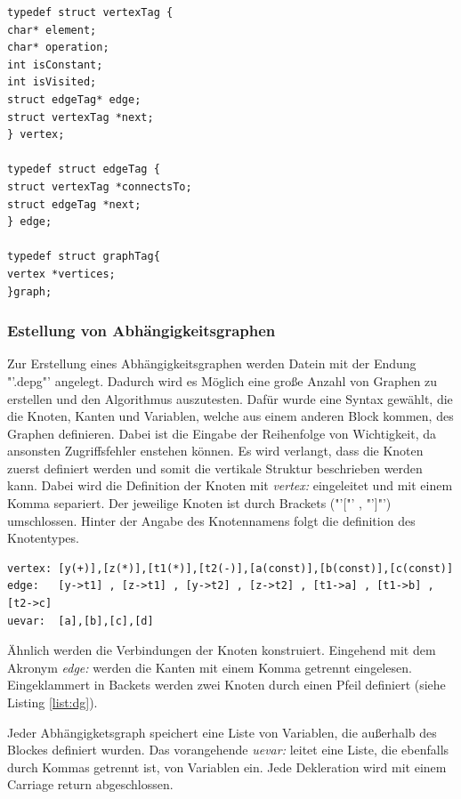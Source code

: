 \begin{lstlisting}[caption=Struktur eines Graphen., label=list:graph]
typedef struct vertexTag {
char* element;    
char* operation;  
int isConstant;
int isVisited;
struct edgeTag* edge;
struct vertexTag *next;
} vertex;

typedef struct edgeTag {
struct vertexTag *connectsTo;
struct edgeTag *next;
} edge;

typedef struct graphTag{
vertex *vertices;
}graph;
\end{lstlisting}

\subsubsection*{Estellung von Abhängigkeitsgraphen}
Zur Erstellung eines Abhängigkeitsgraphen werden Datein mit der Endung "'.depg"' angelegt. Dadurch wird es Möglich eine große Anzahl von Graphen zu erstellen und den Algorithmus auszutesten. Dafür wurde eine Syntax gewählt, die die Knoten, Kanten und Variablen, welche aus einem anderen Block kommen, des Graphen definieren. Dabei ist die Eingabe der Reihenfolge von Wichtigkeit, da ansonsten Zugriffsfehler enstehen können. Es wird verlangt, dass die Knoten zuerst definiert werden und somit die vertikale Struktur beschrieben werden kann. Dabei wird die Definition der Knoten mit \textit{vertex:} eingeleitet und mit einem Komma separiert. Der jeweilige Knoten ist durch Brackets ("'["' , "']"') umschlossen. Hinter der Angabe des Knotennamens folgt die definition des Knotentypes. 
\begin{lstlisting}[caption=Konstruktion eines Abhängigkeitsgraphen., label=list:dg]
vertex: [y(+)],[z(*)],[t1(*)],[t2(-)],[a(const)],[b(const)],[c(const)]
edge:   [y->t1] , [z->t1] , [y->t2] , [z->t2] , [t1->a] , [t1->b] ,[t2->c] 
uevar:  [a],[b],[c],[d]
\end{lstlisting}
Ähnlich werden die Verbindungen der Knoten konstruiert. Eingehend mit dem Akronym \textit{edge:} werden die Kanten mit einem Komma getrennt eingelesen. Eingeklammert in Backets werden zwei Knoten durch einen Pfeil definiert (siehe Listing \ref{list:dg}). 

Jeder Abhängigketsgraph speichert eine Liste von Variablen, die außerhalb des Blockes definiert wurden. Das 
vorangehende \textit{uevar:} leitet eine Liste, die ebenfalls durch Kommas getrennt ist, von Variablen ein. Jede Dekleration wird mit einem Carriage return abgeschlossen.









